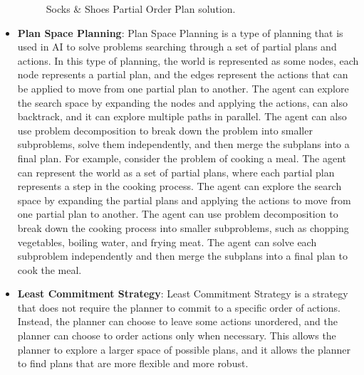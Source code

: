 \begin{itemize}
\begin{figure}[ht]
                  \caption{Socks \& Shoes Partial Order Plan solution.}
                  \label{fig:socks_shoes_partial_order_plan}
            \end{figure}
      \item \label{def:plan_space_planning}
            \textbf{Plan Space Planning}: Plan Space Planning is a type of planning that is used in \ac{AI} to solve problems searching through a set of partial plans and actions. In this type of planning, the world is represented as some nodes, each node represents a partial plan, and the edges represent the actions that can be applied to move from one partial plan to another. The agent can explore the search space by expanding the nodes and applying the actions, can also backtrack, and it can explore multiple paths in parallel. The agent can also use problem decomposition to break down the problem into smaller subproblems, solve them independently, and then merge the subplans into a final plan. For example, consider the problem of cooking a meal. The agent can represent the world as a set of partial plans, where each partial plan represents a step in the cooking process. The agent can explore the search space by expanding the partial plans and applying the actions to move from one partial plan to another. The agent can use problem decomposition to break down the cooking process into smaller subproblems, such as chopping vegetables, boiling water, and frying meat. The agent can solve each subproblem independently and then merge the subplans into a final plan to cook the meal.

      \item \label{def:least_commitment_strategy}
            \textbf{Least Commitment Strategy}: Least Commitment Strategy is a strategy that does not require the planner to commit to a specific order of actions. Instead, the planner can choose to leave some actions unordered, and the planner can choose to order actions only when necessary. This allows the planner to explore a larger space of possible plans, and it allows the planner to find plans that are more flexible and more robust.


\end{itemize}
